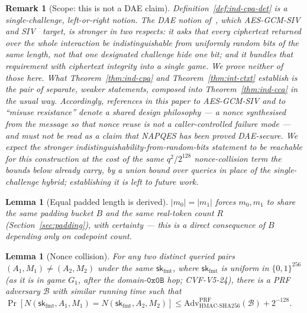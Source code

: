\documentclass[11pt,a4paper]{article}
\newtheorem{lemma}[theorem]{Lemma}
\newtheorem{remark}[theorem]{Remark}
\begin{document}
\begin{remark}[Scope: this is not a DAE claim]\label{rem:dae-scope}
Definition~\ref{def:ind-cpa-det} is a \emph{single-challenge, left-or-right}
notion. The DAE notion of~\cite{rogaway2006}, which AES-GCM-SIV\cite{rfc8452}
and SIV~\cite{rfc5297} target, is stronger in two respects: it asks that
\emph{every} ciphertext returned over the whole interaction be
indistinguishable from uniformly random bits of the same length, not that
one designated challenge hide one bit; and it bundles that requirement with
ciphertext integrity into a single game. We prove neither of those here.
What Theorem~\ref{thm:ind-cpa} and Theorem~\ref{thm:int-ctxt} establish is
the pair of separate, weaker statements, composed into
Theorem~\ref{thm:ind-cca} in the usual way. Accordingly, references in this
paper to AES-GCM-SIV and to ``misuse resistance'' denote a shared design
philosophy — a nonce synthesised from the message so that nonce reuse is
not a caller-controlled failure mode — and must not be read as a claim that
NAPQES has been proved DAE-secure. We expect the stronger
indistinguishability-from-random-bits statement to be reachable for this
construction at the cost of the same $q^2/2^{128}$ nonce-collision term the
bounds below already carry, by a union bound over queries in place of the
single-challenge hybrid; establishing it is left to future work.
\end{remark}

\begin{lemma}[Equal padded length is derived]\label{rem:equal-padded-derived}
$|m_0|=|m_1|$ forces $m_0,m_1$ to share the same padding bucket $B$ and the
same real-token count $R$ (Section~\ref{sec:padding}), with certainty —
this is a direct consequence of $B$ depending only on codepoint count.
\end{lemma}

\begin{lemma}[Nonce collision]\label{lem:nonce-collision}
For any two distinct queried pairs $(A_1,M_1)\neq(A_2,M_2)$ under the same
$\mathsf{sk}_{\mathrm{fmt}}$, where $\mathsf{sk}_{\mathrm{fmt}}$ is
uniform in $\{0,1\}^{256}$ (as it is in game $G_1$, after the
domain-$\texttt{0x0B}$ hop; CVF-V5-24), there is a PRF adversary
$\mathcal{B}$ with similar running time such that
$\Pr[N(\mathsf{sk}_{\mathrm{fmt}},A_1,M_1)=N(\mathsf{sk}_{\mathrm{fmt}},A_2,M_2)] \le \mathrm{Adv}^{\mathrm{PRF}}_{\mathrm{HMAC\text{-}SHA256}}(\mathcal{B}) + 2^{-128}$.
\end{lemma}
\end{document}
